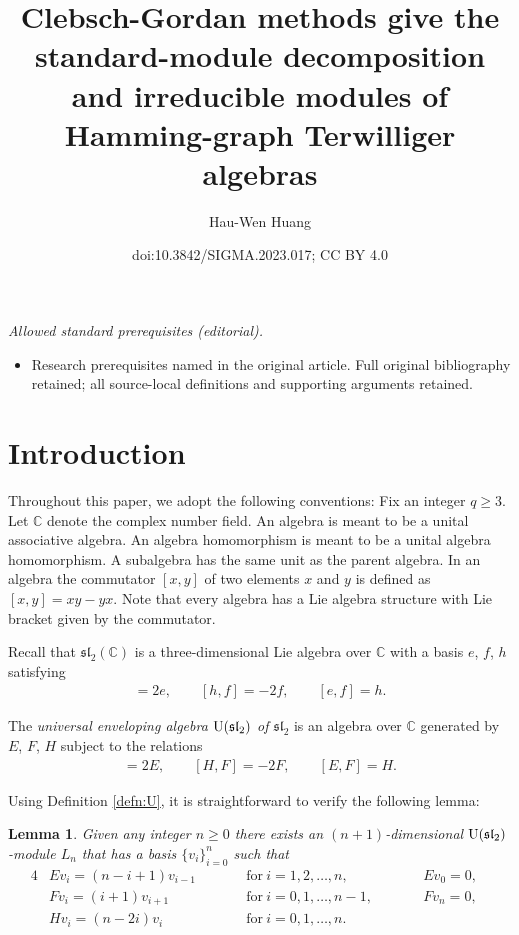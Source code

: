 \documentclass[10pt,a4paper]{amsart}
\title{Clebsch-Gordan methods give the standard-module decomposition and irreducible modules of Hamming-graph Terwilliger algebras}
\author{Hau-Wen Huang}
\date{doi:10.3842/SIGMA.2023.017; CC BY 4.0}
\def\C{\mathbb C}
\def\U{{\rm U}(\mathfrak{sl}_2)}
\numberwithin{equation}{section}
\newtheorem{Lemma}[Theorem]{Lemma}
\begin{document}
\maketitle
\noindent\textit{Allowed standard prerequisites (editorial).}\begin{itemize}
\item Research prerequisites named in the original article. Full original bibliography retained; all source-local definitions and supporting arguments retained.
\end{itemize}\medskip
\section{Introduction}\label{s:introduction}

Throughout this paper, we adopt the following conventions: Fix an integer $q\geq 3$. Let $\C$ denote the complex number field. An algebra is meant to be a unital associative algebra. An algebra homomorphism is meant to be a unital algebra homomorphism. A subalgebra has the same unit as the parent algebra.
In an algebra the commutator $[x,y]$ of two elements $x$ and $y$ is defined as
$[x,y]=xy-yx$. Note that every algebra has a Lie algebra structure with Lie bracket given by the commutator.

Recall that $\mathfrak{sl}_2(\C)$ is a three-dimensional Lie algebra over $\C$ with a basis $e$, $f$, $h$ satisfying
\begin{gather*}
[h,e]=2e,\qquad
[h,f]=-2f,\qquad
[e,f]=h.
\end{gather*}

\begin{Definition}\label{defn:U}
The {\it universal enveloping algebra $\U$ of $\mathfrak{sl}_2$} is an algebra over $\C$ generated by $E$, $F$, $H$ subject to the relations
\begin{gather*}
[H,E]=2E,\qquad
[H,F]=-2F,\qquad
[E,F]=H.
\end{gather*}
\end{Definition}

Using Definition \ref{defn:U}, it is straightforward to verify the following lemma:

\begin{Lemma}\label{lem:Vn_U}
Given any integer $n\geq 0$ there exists an $(n+1)$-dimensional $\U$-module $L_n$
that has a basis $\{v_i\}_{i=0}^n$ such that
\begin{alignat*}{4}
&E v_i=(n-i+1) v_{i-1}\qquad&&
\text{for}\ i=1,2,\dots,n,\qquad&&
E v_0=0,&
\\
&F v_i=(i+1) v_{i+1}\qquad&&
\text{for}\ i=0,1,\dots,n-1,\qquad&&
F v_n=0,&
\\
&H v_i=(n-2i) v_i\qquad &&\text{for}\ i=0,1,\dots,n.&&&
\end{alignat*}
\end{Lemma}
\end{document}
